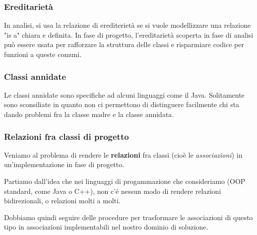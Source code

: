 \documentclass[a4paper,11pt]{article}
\begin{document}
\subsubsection{Ereditarietà}
In analisi, si usa la relazione di erediterietà se si vuole modellizzare una relazione "is a" chiara e definita.
In fase di progetto, l'ereditarietà scoperta in fase di analisi può essere usata per rafforzare la struttura delle classi e risparmiare codice per funzioni a queste comuni.

\subsubsection{Classi annidate}
Le classi annidate sono specifiche ad alcuni linguaggi come il Java. Solitamente sono sconsiliate in quanto non ci permettono di distinguere facilmente chi sta dando problemi fra la classe madre e la classe annidata. 

\subsubsection{Relazioni fra classi di progetto}
Veniamo al problema di rendere le \textbf{relazioni} fra classi (cioè le \textit{associazioni}) in un'implementazione in fase di progetto.

Partiamo dall'idea che nei linguaggi di progammazione che consideriamo (OOP standard, come Java o C++), non c'é nessun modo di rendere relazioni bidirezionali, o relazioni molti a molti.

Dobbiamo quindi seguire delle procedure per trasformare le associazioni di questo tipo in associazioni implementabili nel nostro dominio di soluzione.
\end{document}
